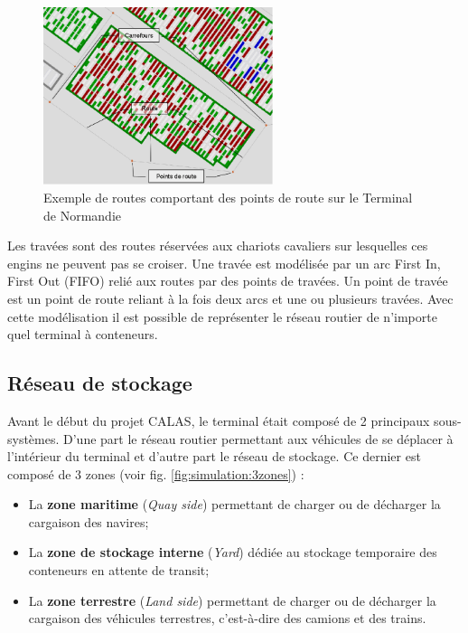 \begin{figure}[h]
 \centering
 \includegraphics[width=0.6\textwidth]{chapitres/simulation/grapheRoutier.png}
 \caption{Exemple de routes comportant des points de route sur le Terminal de Normandie}
 \label{fig:simulation:grapheRoutier}
\end{figure}

Les travées sont des routes réservées aux chariots cavaliers sur lesquelles ces engins ne peuvent pas se croiser. Une travée est modélisée par un arc First In, First Out (FIFO) relié aux routes par des points de travées. Un point de travée est un point de route reliant à la fois deux arcs et une ou plusieurs travées. Avec cette modélisation il est possible de représenter le réseau routier de n'importe quel terminal à conteneurs.

\subsection{Réseau de stockage}

Avant le début du projet CALAS, le terminal était composé de 2 principaux sous-systèmes. D'une part le réseau routier permettant aux véhicules de se déplacer à l'intérieur du terminal et d'autre part le réseau de stockage. Ce dernier est composé de 3 zones (voir fig. \ref{fig:simulation:3zones}) :
\begin{itemize}
 \item La \textbf{zone maritime} (\textit{Quay side}) permettant de charger ou de décharger la cargaison des navires;
 \item La \textbf{zone de stockage interne} (\textit{Yard}) dédiée au stockage temporaire des conteneurs en attente de transit;
 \item La \textbf{zone terrestre} (\textit{Land side}) permettant de charger ou de décharger la cargaison des véhicules terrestres, c'est-à-dire des camions et des trains.
\end{itemize}

